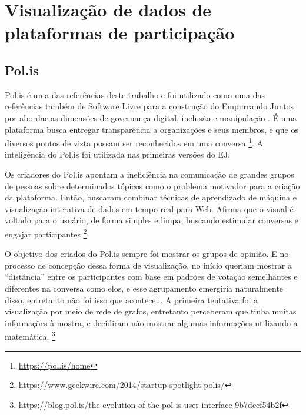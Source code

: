 \chapter{Visualização de dados de plataformas de participação}
\label{chap:2}
\section{Pol.is}

Pol.is é uma das referências deste trabalho e foi utilizado como uma das referências também de Software Livre para a construção do Empurrando Juntos por abordar as dimensões de governança digital, inclusão e manipulação \cite{poppi2017}. É uma plataforma busca entregar transparência a organizações e seus membros, e que os diversos pontos de vista possam ser reconhecidos em uma conversa \footnote{\href{https://pol.is/home}{https://pol.is/home}}. 
A inteligência do Pol.is foi utilizada nas primeiras versões do EJ.

Os criadores do Pol.is apontam a ineficiência na comunicação de grandes grupos de pessoas sobre determinados tópicos como o problema motivador para a criação da plataforma. Então, buscaram combinar técnicas de aprendizado de máquina e visualização interativa de dados em tempo real para Web. Afirma que o visual é voltado para o usuário, de forma simples e limpa, buscando estimular conversas e engajar participantes \footnote{\href{https://www.geekwire.com/2014/startup-spotlight-polis/}{https://www.geekwire.com/2014/startup-spotlight-polis/}}.



O objetivo dos criados do Pol.is sempre foi mostrar os grupos de opinião. E no processo de concepção dessa forma de visualização, no início queriam mostrar a “distância” entre os participantes com base em padrões de votação semelhantes e diferentes na conversa como elos, e esse agrupamento emergiria naturalmente disso, entretanto não foi isso que aconteceu. A primeira tentativa foi a visualização por meio de rede de grafos, entretanto perceberam que tinha muitas informações à mostra, e decidiram não mostrar algumas informações utilizando a matemática. \footnote{\href{https://blog.pol.is/the-evolution-of-the-pol-is-user-interface-9b7dccf54b2f}{https://blog.pol.is/the-evolution-of-the-pol-is-user-interface-9b7dccf54b2f}}

